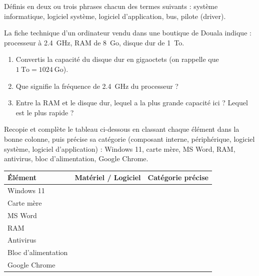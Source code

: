 \documentclass[11pt]{article}
\newcommand{\cle}[1]{{\popxbold\color{popdark}#1}}
\newcounter{popsec}
\newcounter{popsub}
\newcommand{\courssub}[1]{%
  \stepcounter{popsub}%
  \par\vspace{9pt}\noindent{\popxbold\fontsize{11.5}{13}\selectfont\color{popink}{\color{poporange}\thepopsec.\thepopsub}\hspace{6pt}#1}\par\nopagebreak\vspace{4pt}
}
\begin{document}
\begin{exercice}[Définitions]
Définis en deux ou trois phrases chacun des termes suivants : \cle{système informatique}, \cle{logiciel système}, \cle{logiciel d'application}, \cle{bus}, \cle{pilote (driver)}.
\end{exercice}

\begin{exercice}
La fiche technique d'un ordinateur vendu dans une boutique de Douala indique : processeur à \SI{2,4}{GHz}, RAM de \SI{8}{Go}, disque dur de \SI{1}{To}.
\begin{enumerate}
\item Convertis la capacité du disque dur en gigaoctets (on rappelle que $1\ \text{To} = 1024\ \text{Go}$).
\item Que signifie la fréquence de \SI{2,4}{GHz} du processeur ?
\item Entre la RAM et le disque dur, lequel a la plus grande capacité ici ? Lequel est le plus rapide ?
\end{enumerate}
\end{exercice}

\courssub{Je m'entraîne}

\begin{exercice}
Recopie et complète le tableau ci-dessous en classant chaque élément dans la bonne colonne, puis précise sa catégorie (composant interne, périphérique, logiciel système, logiciel d'application) : Windows 11, carte mère, MS Word, RAM, antivirus, bloc d'alimentation, Google Chrome.
\begin{center}
\begin{tabularx}{\linewidth}{|l|X|X|}
\hline
\rowcolor{popblueL} \textbf{Élément} & \textbf{Matériel / Logiciel} & \textbf{Catégorie précise} \\
\hline
Windows 11 & & \\
\hline
Carte mère & & \\
\hline
MS Word & & \\
\hline
RAM & & \\
\hline
Antivirus & & \\
\hline
Bloc d'alimentation & & \\
\hline
Google Chrome & & \\
\hline
\end{tabularx}
\end{center}
\end{exercice}
\end{document}
